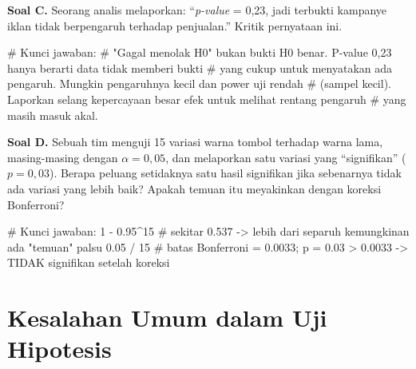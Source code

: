 \documentclass[
  indonesian,
  letterpaper,
]{book}
\newenvironment{Shaded}{\begin{snugshade}}{\end{snugshade}}
\newcommand{\CommentTok}[1]{\textcolor[rgb]{0.37,0.37,0.37}{#1}}
\newcommand{\DecValTok}[1]{\textcolor[rgb]{0.68,0.00,0.00}{#1}}
\newcommand{\FloatTok}[1]{\textcolor[rgb]{0.68,0.00,0.00}{#1}}
\newcommand{\SpecialCharTok}[1]{\textcolor[rgb]{0.37,0.37,0.37}{#1}}
\begin{document}
\textbf{Soal C.} Seorang analis melaporkan: ``\emph{p-value} = 0,23,
jadi terbukti kampanye iklan tidak berpengaruh terhadap penjualan.''
Kritik pernyataan ini.

\begin{Shaded}
\begin{Highlighting}[]
\CommentTok{\# Kunci jawaban:}
\CommentTok{\# "Gagal menolak H0" bukan bukti H0 benar. P{-}value 0,23 hanya berarti data tidak memberi bukti}
\CommentTok{\# yang cukup untuk menyatakan ada pengaruh. Mungkin pengaruhnya kecil dan power uji rendah}
\CommentTok{\# (sampel kecil). Laporkan selang kepercayaan besar efek untuk melihat rentang pengaruh}
\CommentTok{\# yang masih masuk akal.}
\end{Highlighting}
\end{Shaded}

\textbf{Soal D.} Sebuah tim menguji 15 variasi warna tombol terhadap
warna lama, masing-masing dengan \(\alpha = 0{,}05\), dan melaporkan
satu variasi yang ``signifikan'' (\(p = 0{,}03\)). Berapa peluang
setidaknya satu hasil signifikan jika sebenarnya tidak ada variasi yang
lebih baik? Apakah temuan itu meyakinkan dengan koreksi Bonferroni?

\begin{Shaded}
\begin{Highlighting}[]
\CommentTok{\# Kunci jawaban:}
\DecValTok{1} \SpecialCharTok{{-}} \FloatTok{0.95}\SpecialCharTok{\^{}}\DecValTok{15}   \CommentTok{\# sekitar 0.537 {-}\textgreater{} lebih dari separuh kemungkinan ada "temuan" palsu}
\FloatTok{0.05} \SpecialCharTok{/} \DecValTok{15}     \CommentTok{\# batas Bonferroni = 0.0033; p = 0.03 \textgreater{} 0.0033 {-}\textgreater{} TIDAK signifikan setelah koreksi}
\end{Highlighting}
\end{Shaded}

\section{Kesalahan Umum dalam Uji
Hipotesis}\label{kesalahan-umum-dalam-uji-hipotesis}
\end{document}
